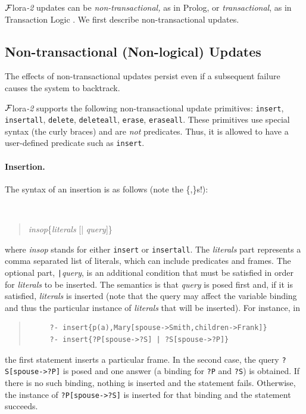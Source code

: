 \documentclass[11pt]{article}
\newcommand{\FLSYSTEM}{{\mbox{\sc ${\cal F}${lora}\rm\emph{-2}}}\xspace}
\begin{document}
\FLSYSTEM updates can be \emph{non-transactional,} as in Prolog, or
\emph{transactional}, as in Transaction Logic
\cite{trans-chapter-98,trans-tcs94}.  We first describe non-transactional
updates.


\subsection{Non-transactional (Non-logical) Updates}
\label{sec:non-transactional-updates}

%
The effects of non-transactional updates persist even if a subsequent failure
causes the system to backtrack.

\FLSYSTEM supports the following non-transactional update primitives:
{\tt insert}, {\tt insertall}, {\tt delete}, {\tt deleteall},
{\tt erase}, {\tt eraseall}. These primitives use special syntax (the curly
braces) and are \emph{not} predicates. Thus, it is allowed to have a
user-defined predicate such as {\tt insert}.

%
\paragraph{Insertion.} The syntax of an insertion is as follows (note the
\{,\}s!):
{\tt
\begin{quote}
\emph{insop}\{\emph{literals} [| \emph{query}]\}
\end{quote}
}
\noindent
where {\it insop} stands for either {\tt insert} or {\tt insertall}.
The
{\it literals} part represents a comma separated list of literals,
which can include
predicates and \mbox{frames}. The optional part, {\tt |}{\it query},
is an additional condition that must be satisfied in order for
\emph{literals} to be inserted.
The semantics is that \emph{query} is posed first and, if it is
satisfied, \emph{literals} is inserted (note that the query may affect the
variable binding and thus the particular instance of \emph{literals} that
will be inserted). For instance, in
\begin{quote}
\begin{verbatim}
     ?- insert{p(a),Mary[spouse->Smith,children->Frank]}
     ?- insert{?P[spouse->?S] | ?S[spouse->?P]}
\end{verbatim}
\end{quote}
the first statement inserts a particular frame. In the second case, the
query {\tt ?S[spouse->?P]} is posed and one answer (a binding for {\tt ?P} and
{\tt ?S}) is obtained. If there is no such binding, nothing is inserted and
the statement fails. Otherwise, the instance of {\tt ?P[spouse->?S]} is
inserted for that binding and the statement succeeds.
\end{document}
